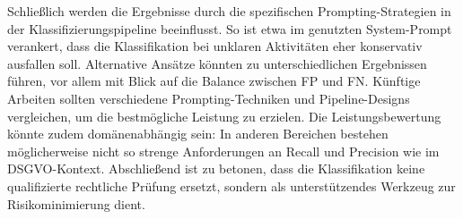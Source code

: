 Schließlich werden die Ergebnisse durch die spezifischen Prompting-Strategien in der Klassifizierungspipeline beeinflusst. So ist etwa im genutzten System-Prompt verankert, dass die Klassifikation bei unklaren Aktivitäten eher konservativ ausfallen soll. Alternative Ansätze könnten zu unterschiedlichen Ergebnissen führen, vor allem mit Blick auf die Balance zwischen \ac{FP} und \ac{FN}. Künftige Arbeiten sollten verschiedene Prompting-Techniken und Pipeline-Designs vergleichen, um die bestmögliche Leistung zu erzielen. Die Leistungsbewertung könnte zudem domänenabhängig sein: In anderen Bereichen bestehen möglicherweise nicht so strenge Anforderungen an Recall und Precision wie im \ac{DSGVO}-Kontext. Abschließend ist zu betonen, dass die Klassifikation keine qualifizierte rechtliche Prüfung ersetzt, sondern als unterstützendes Werkzeug zur Risikominimierung dient.